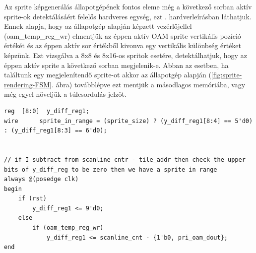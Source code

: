 	Az sprite képgenerálás állapotgépének fontos eleme még a következő sorban aktív sprite-ok detektálásáért felelős hardveres egység, ezt . hardverleírásban láthatjuk. Ennek alapja, hogy az állapotgép alapján képzett vezérlőjellel (oam\_temp\_reg\_wr) elmentjük az éppen aktív OAM sprite vertikális pozíció értékét és az éppen aktív sor értékből kivonva egy vertikális különbség értéket képzünk. Ezt vizsgálva a 8x8 és 8x16-os spritok esetére, detektálhatjuk, hogy az éppen aktív sprite a következő sorban megjelenik-e. Abban az esetben, ha találtunk egy megjelenítendő sprite-ot akkor az állapotgép alapján (\ref{fig:sprite-rendering-FSM}. ábra) továbblépve ezt mentjük a másodlagos memóriába, vagy még egyel növeljük a túlcsordulás jelzőt. 

\begin{lstlisting}[caption={A következő kép generálási sorban aktív sprite-ok jelzése}, label={code:Sprite-in-range}, style=prettyverilog]
reg  [8:0]  y_diff_reg1;
wire      sprite_in_range = (sprite_size) ? (y_diff_reg1[8:4] == 5'd0) : (y_diff_reg1[8:3] == 6'd0);


// if I subtract from scanline cntr - tile_addr then check the upper bits of y_diff_reg to be zero then we have a sprite in range
always @(posedge clk) 
begin
	if (rst)
		y_diff_reg1 <= 9'd0;
	else
		if (oam_temp_reg_wr)
			y_diff_reg1 <= scanline_cnt - {1'b0, pri_oam_dout};    
end\end{lstlisting}

